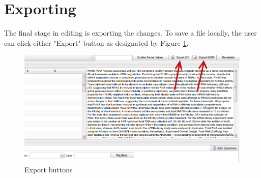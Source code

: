 \documentclass[a4paper]{article}
\begin{document}
\newpage
\section{Exporting}
The final stage in editing is exporting the changes. To save a file locally, the user can click either "Export" button as designated by Figure \ref{export}.

\begin{figure}
\caption{Export buttons}
\centering
\label{export}
\includegraphics[width=17cm]{images/export}
\end{figure}
\end{document}
